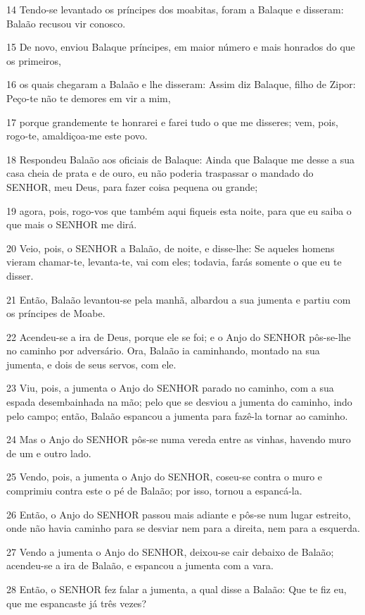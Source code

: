 \par 14 Tendo-se levantado os príncipes dos moabitas, foram a Balaque e disseram: Balaão recusou vir conosco.
\par 15 De novo, enviou Balaque príncipes, em maior número e mais honrados do que os primeiros,
\par 16 os quais chegaram a Balaão e lhe disseram: Assim diz Balaque, filho de Zipor: Peço-te não te demores em vir a mim,
\par 17 porque grandemente te honrarei e farei tudo o que me disseres; vem, pois, rogo-te, amaldiçoa-me este povo.
\par 18 Respondeu Balaão aos oficiais de Balaque: Ainda que Balaque me desse a sua casa cheia de prata e de ouro, eu não poderia traspassar o mandado do SENHOR, meu Deus, para fazer coisa pequena ou grande;
\par 19 agora, pois, rogo-vos que também aqui fiqueis esta noite, para que eu saiba o que mais o SENHOR me dirá.
\par 20 Veio, pois, o SENHOR a Balaão, de noite, e disse-lhe: Se aqueles homens vieram chamar-te, levanta-te, vai com eles; todavia, farás somente o que eu te disser.
\par 21 Então, Balaão levantou-se pela manhã, albardou a sua jumenta e partiu com os príncipes de Moabe.
\par 22 Acendeu-se a ira de Deus, porque ele se foi; e o Anjo do SENHOR pôs-se-lhe no caminho por adversário. Ora, Balaão ia caminhando, montado na sua jumenta, e dois de seus servos, com ele.
\par 23 Viu, pois, a jumenta o Anjo do SENHOR parado no caminho, com a sua espada desembainhada na mão; pelo que se desviou a jumenta do caminho, indo pelo campo; então, Balaão espancou a jumenta para fazê-la tornar ao caminho.
\par 24 Mas o Anjo do SENHOR pôs-se numa vereda entre as vinhas, havendo muro de um e outro lado.
\par 25 Vendo, pois, a jumenta o Anjo do SENHOR, coseu-se contra o muro e comprimiu contra este o pé de Balaão; por isso, tornou a espancá-la.
\par 26 Então, o Anjo do SENHOR passou mais adiante e pôs-se num lugar estreito, onde não havia caminho para se desviar nem para a direita, nem para a esquerda.
\par 27 Vendo a jumenta o Anjo do SENHOR, deixou-se cair debaixo de Balaão; acendeu-se a ira de Balaão, e espancou a jumenta com a vara.
\par 28 Então, o SENHOR fez falar a jumenta, a qual disse a Balaão: Que te fiz eu, que me espancaste já três vezes?
